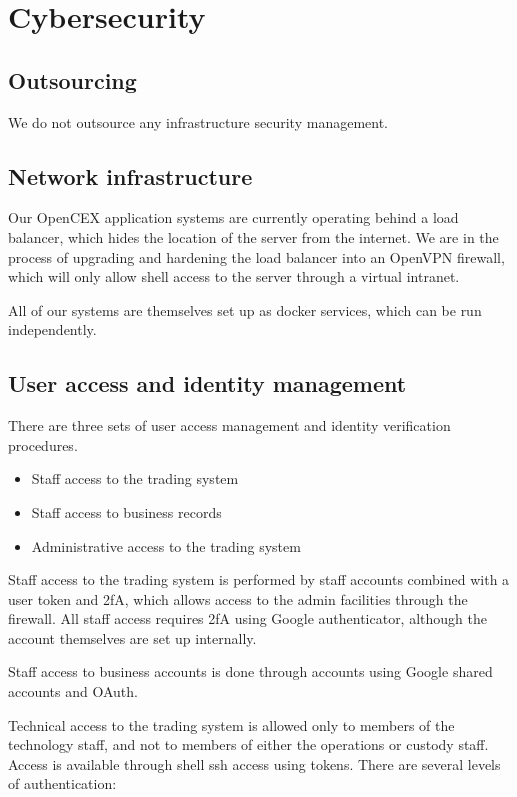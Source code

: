 \section{Cybersecurity}
\subsection{Outsourcing}
We do not outsource any infrastructure security management.

\subsection{Network infrastructure}
Our OpenCEX application systems are currently operating behind a load balancer,
which hides the location of the server from the internet.  We are in
the process of upgrading and hardening the load balancer into an OpenVPN firewall, which will only allow shell access to the server through a virtual intranet.

All of our systems are themselves set up as docker services, which can
be run independently.

\subsection{User access and identity management}

There are three sets of user access management and identity
verification procedures.
\begin{itemize}
\item Staff access to the trading system
\item Staff access to business records
\item Administrative access to the trading system
\end{itemize}

Staff access to the trading system is performed by staff accounts
combined with a user token and 2fA, which allows access to the admin
facilities through the firewall.  All staff access requires 2fA using
Google authenticator, although the account themselves are set up
internally.

Staff access to business accounts is done through accounts using
Google shared accounts and OAuth.

Technical access to the trading system is allowed only to members of
the technology staff, and not to members of either the operations or
custody staff.  Access is available through shell ssh access using
tokens.  There are several levels of authentication:

